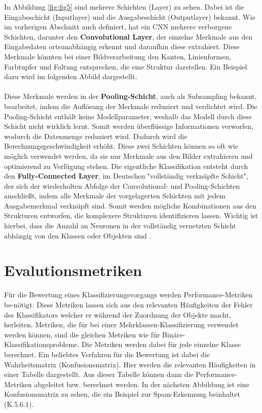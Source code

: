 \documentclass[12pt]{scrreprt}
\begin{document}
In Abbildung \ref{fig:fig5} sind mehrere Schichten (Layer) zu sehen. Dabei ist die Eingabeschicht (Inputlayer) und die Ausgabeschicht (Outputlayer) bekannt. Wie im vorherigen Abschnitt auch definiert, hat ein CNN mehrere verborgene Schichten, darunter den \textbf{Convolutional Layer}, der einzelne Merkmale aus den Eingabedaten ortsunabhängig erkennt und daraufhin diese extrahiert. Diese Merkmale könnten bei einer Bildverarbeitung den Kanten, Linienformen, Farbtupfer und Faltung entsprechen, die eine Struktur darstellen. Ein Beispiel dazu wird im folgenden Abbild dargestellt.\\
\\
Diese Merkmale werden in der \textbf{Pooling-Schicht}, auch als Subsampling bekannt, bearbeitet, indem die Auflösung der Merkmale reduziert und verdichtet wird. Die Pooling-Schicht enthält keine Modellparameter, weshalb das Modell durch diese Schicht nicht wirklich lernt. Somit werden überflüssige Informationen verworfen, wodurch die Datenmenge reduziert wird. Dadurch wird die Berechnungsgeschwindigkeit erhöht. Diese zwei Schichten können so oft wie möglich verwendet werden, da sie nur Merkmale aus den Bilder extrahieren und optimierend zu Verfügung stehen. Die eigentliche Klassifikation entsteht durch den \textbf{Fully-Connected Layer}, im Deutschen "vollständig verknüpfte Schicht", der sich der wiederholten Abfolge der Convolutional- und Pooling-Schichten anschließt, indem alle Merkmale der vorgelagerten Schichten mit jedem Ausgabemerkmal verknüpft sind. Somit werden mögliche Kombinationen aus den Strukturen entworfen, die komplexere Strukturen identifizieren lassen. Wichtig ist hierbei, dass die Anzahl an Neuronen in der vollständig vernetzten Schicht abhängig von den Klassen oder Objekten sind \cite{Luber2019}. 
	
\section{Evalutionsmetriken}
	
Für die Bewertung eines Klassifizierungsvorgangs werden Performance-Metriken be-nötigt. Diese Metriken lassen sich aus den relevanten Häufigkeiten der Fehler des Klassifikators welcher er während der Zuordnung der Objekte macht, herleiten. Metriken, die für bei einer Mehrklassen-Klassifizierung verwendet werden können, sind die gleichen Metriken wie für Binäre-Klassifikationsprobleme. Die Metriken werden dabei für jede einzelne Klasse berechnet. Ein beliebtes Verfahren für die Bewertung ist dabei die Wahrheitsmatrix (Konfusionsmatrix). Hier werden die relevanten Häufigkeiten in einer Tabelle dargestellt. Aus dieser Tabelle können dann die Performance-Metriken abgeleitet bzw. berechnet werden. In der nächsten Abbildung ist eine Konfusionsmatrix zu sehen, die ein Beispiel zur Spam-Erkennung beinhaltet \cite{Burkov2019} (K.5.6.1).
\end{document}
